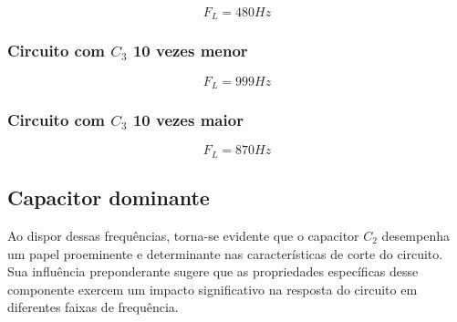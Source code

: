 \begin{equation}
    F_L = 480 Hz
\end{equation}

\subsubsection{Circuito com $C_3$ 10 vezes menor}

\begin{equation}
    F_L = 999 Hz
\end{equation}

\subsubsection{Circuito com $C_3$ 10 vezes maior}

\begin{equation}
    F_L = 870 Hz
\end{equation}

\subsection{Capacitor dominante}

Ao dispor dessas frequências, torna-se evidente que o capacitor $C_2$ desempenha um papel proeminente e determinante nas características de corte do circuito. Sua influência preponderante sugere que as propriedades específicas desse componente exercem um impacto significativo na resposta do circuito em diferentes faixas de frequência.